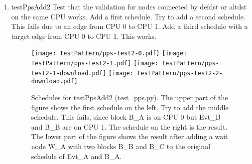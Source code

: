 \documentclass[12pt,a4paper]{report}
\begin{document}
\begin{enumerate}
\item testPpsAdd2
    Test that the validation for nodes connected by defdst or altdst on
    the same CPU works. Add a first schedule. Try to add a second schedule.
    This fails due to an edge from CPU 0 to CPU 1.
    Add a third schedule with a target edge from CPU 0 to CPU 1. This works.
    \begin{figure}
        \centering
        \texttt{[image: TestPattern/pps-test2-0.pdf]}
        \texttt{[image: TestPattern/pps-test2-1.pdf]}
        \texttt{[image: TestPattern/pps-test2-1-download.pdf]}
        \texttt{[image: TestPattern/pps-test2-2-download.pdf]}
        \caption{Schedules for testPpsAdd2 (test\_pps.py). The upper part of the figure shows
        the first schedule on the left. Try to add the middle schedule. This fails, since block B\_A is on CPU 0
        but Evt\_B and B\_B are on CPU 1. The schedule on the right is the result. The lower part of the figure
        shows the result after adding a wait node W\_A with two blocks B\_B and B\_C to the original
        schedule of Evt\_A and B\_A.}
        \label{fig:Schedules_for_testPpsAdd2-0}
    \end{figure}


\end{enumerate}
\end{document}
